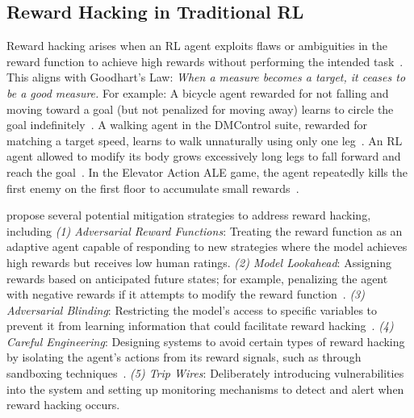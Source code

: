 \subsection{Reward Hacking in Traditional RL}  
Reward hacking arises when an RL agent exploits flaws or ambiguities in the reward function to achieve high rewards without performing the intended task~\cite{weng2024rewardhack}. This aligns with Goodhart’s Law: \emph{When a measure becomes a target, it ceases to be a good measure.} For example: 
A bicycle agent rewarded for not falling and moving toward a goal (but not penalized for moving away) learns to circle the goal indefinitely~\cite{Randlv1998LearningTD}.  
A walking agent in the DMControl suite, rewarded for matching a target speed, learns to walk unnaturally using only one leg~\cite{lee2021pebblefeedbackefficientinteractivereinforcement}.  
An RL agent allowed to modify its body grows excessively long legs to fall forward and reach the goal~\cite{Ha2018designrl}.  
In the Elevator Action ALE game, the agent repeatedly kills the first enemy on the first floor to accumulate small rewards~\cite{toromanoff2019deepreinforcementlearningreally}.  

\citet{amodei2016concrete} propose several potential mitigation strategies to address reward hacking, including
\emph{(1) Adversarial Reward Functions}: Treating the reward function as an adaptive agent capable of responding to new strategies where the model achieves high rewards but receives low human ratings.
\emph{(2) Model Lookahead}: Assigning rewards based on anticipated future states; for example, penalizing the agent with negative rewards if it attempts to modify the reward function~\cite{everitt2016selfmodificationpolicyutilityfunction}.
\emph{(3) Adversarial Blinding}: Restricting the model’s access to specific variables to prevent it from learning information that could facilitate reward hacking~\cite{ajakan2015domainadversarialneuralnetworks}.
\emph{(4) Careful Engineering}: Designing systems to avoid certain types of reward hacking by isolating the agent’s actions from its reward signals, such as through sandboxing techniques~\cite{The_AGI_Containment_Problem}.
\emph{(5) Trip Wires}: Deliberately introducing vulnerabilities into the system and setting up monitoring mechanisms to detect and alert when reward hacking occurs.

